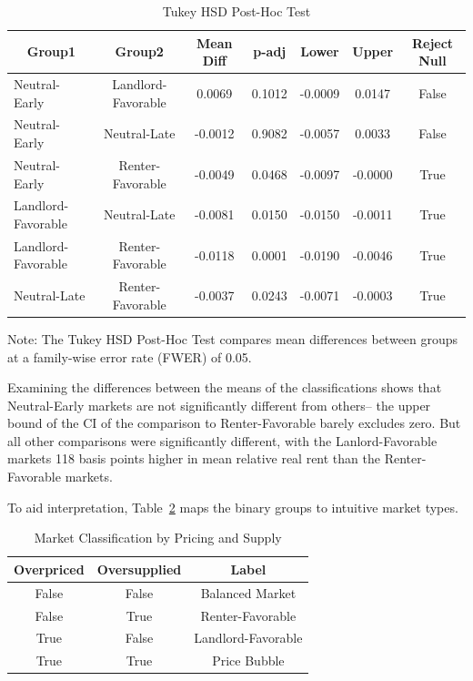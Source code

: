 \documentclass[APA,Times1COL]{WileyNJDv5} %
\begin{document}
\begin{table}[t]
	\centering
	\begin{threeparttable}
		\caption{Tukey HSD Post-Hoc Test\label{tab:tukey}}
		\begin{tabular}{lcccccc}
			\toprule
			\multicolumn{1}{c}{Group1} & Group2             & Mean Diff & p-adj  & Lower  & Upper & Reject Null\\
			\midrule
			Neutral-Early               & Landlord-Favorable  & 0.0069   & 0.1012 & -0.0009 & 0.0147  & False \\
			Neutral-Early               & Neutral-Late         & -0.0012  & 0.9082 & -0.0057 & 0.0033  & False \\
			Neutral-Early              & Renter-Favorable    & -0.0049  & 0.0468 & -0.0097 & -0.0000 & True  \\
			Landlord-Favorable    & Neutral-Late         & -0.0081  & 0.0150 & -0.0150 & -0.0011 & True  \\
			Landlord-Favorable    & Renter-Favorable    & -0.0118  & 0.0001 & -0.0190 & -0.0046 & True  \\
			Neutral-Late           & Renter-Favorable    & -0.0037  & 0.0243 & -0.0071 & -0.0003 & True  \\
			\bottomrule
		\end{tabular}
		\begin{tablenotes}
			\footnotesize
			\item Note: The Tukey HSD Post-Hoc Test compares mean differences between groups at a family-wise error rate (FWER) of 0.05. 
		\end{tablenotes}
	\end{threeparttable}
\end{table}

Examining the differences between the means of the classifications shows that Neutral-Early markets are not significantly different from others-- the upper bound of the CI of the comparison to Renter-Favorable barely excludes zero. But all other comparisons were significantly different, with the Lanlord-Favorable markets 118 basis points higher in mean relative real rent than the Renter-Favorable markets. 

To aid interpretation, Table~\ref{tab:matrixlabels} maps the binary groups to intuitive market types.

\begin{table}[h!]
	\centering
	\caption*{Market Classification by Pricing and Supply}
	\label{tab:matrixlabels}
	\begin{tabular}{cc|c}
		\toprule
		\textbf{Overpriced} & \textbf{Oversupplied} & \textbf{Label} \\
		\midrule
		False & False & Balanced Market \\
		False & True & Renter-Favorable \\
		True  & False & Landlord-Favorable \\
		True  & True  & Price Bubble \\
		\bottomrule
	\end{tabular}
\end{table}
\end{document}
